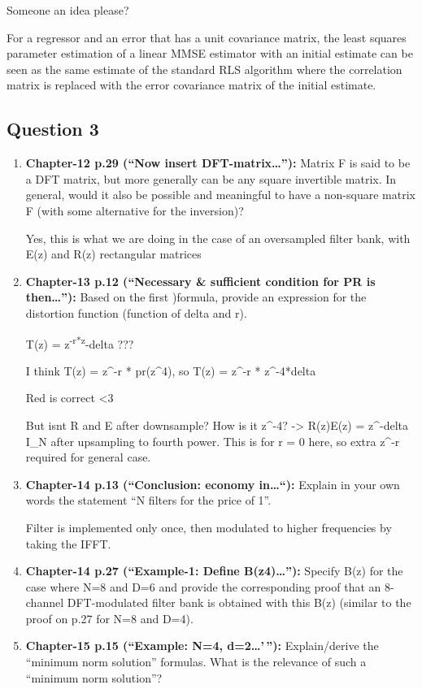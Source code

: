 \documentclass[
  a4paper,
  ,captions=tableheading
]{scrartcl}
\begin{document}
\begin{enumerate}
  Someone an idea please?

  For a regressor and an error that has a unit covariance matrix, the
  least squares parameter estimation of a linear MMSE estimator with an
  initial estimate can be seen as the same estimate of the standard RLS
  algorithm where the correlation matrix is replaced with the error
  covariance matrix of the initial estimate.
\end{enumerate}

\subsection{\texorpdfstring{\textbf{Question
3}}{Question 3}}\label{question-3-1}

\begin{enumerate}
\def\labelenumi{\arabic{enumi}.}
\item
  \textbf{Chapter-12 p.29 (``Now insert DFT-matrix\ldots''):} Matrix F
  is said to be a DFT matrix, but more generally can be any square
  invertible matrix. In general, would it also be possible and
  meaningful to have a non-square matrix F (with some alternative for
  the inversion)?

  Yes, this is what we are doing in the case of an oversampled filter
  bank, with E(z) and R(z) rectangular matrices
\item
  \textbf{Chapter-13 p.12 (``Necessary \& sufficient condition for PR is
  then\ldots''):} Based on the first )formula, provide an expression for
  the distortion function (function of delta and r).

  T(z) = z\textsuperscript{-r*z}-delta ???

  I think T(z) = z\^{}-r * pr(z\^{}4), so T(z) = z\^{}-r * z\^{}-4*delta

  Red is correct \textless3

  But isnt R and E after downsample? How is it z\^{}-4? -\textgreater{}
  R(z)E(z) = z\^{}-delta I\_N after upsampling to fourth power. This is
  for r = 0 here, so extra z\^{}-r required for general case.
\item
  \textbf{Chapter-14 p.13 (``Conclusion: economy in\ldots``):} Explain
  in your own words the statement ``N filters for the price of 1''.

  Filter is implemented only once, then modulated to higher frequencies
  by taking the IFFT.
\item
  \textbf{Chapter-14 p.27 (``Example-1: Define B(z4)\ldots''):} Specify
  B(z) for the case where N=8 and D=6 and provide the corresponding
  proof that an 8-channel DFT-modulated filter bank is obtained with
  this B(z) (similar to the proof on p.27 for N=8 and D=4).
\item
  \textbf{Chapter-15 p.15 (``Example: N=4, d=2\ldots'\,''):}
  Explain/derive the ``minimum norm solution'' formulas. What is the
  relevance of such a ``minimum norm solution''?
\end{enumerate}
\end{document}
